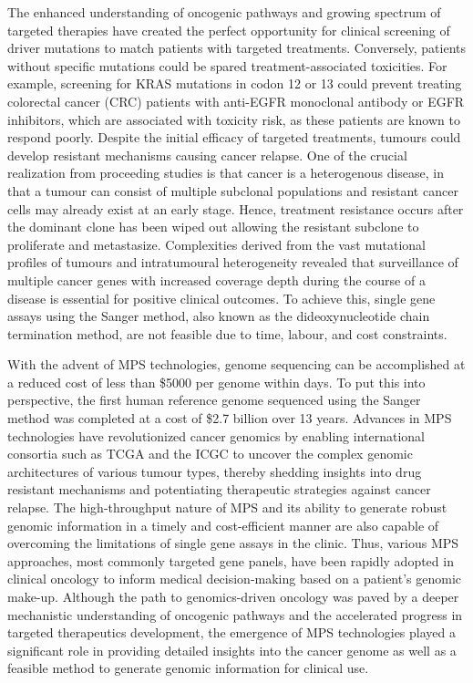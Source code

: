 The enhanced understanding of oncogenic pathways and growing spectrum of targeted therapies have created the perfect opportunity for clinical screening of driver mutations to match patients with targeted treatments. Conversely, patients without specific mutations could be spared treatment-associated toxicities. For example, screening for KRAS mutations in codon 12 or 13 could prevent treating colorectal cancer (CRC) patients with anti-EGFR monoclonal antibody or EGFR inhibitors, which are associated with toxicity risk, as these patients are known to respond poorly. Despite the initial efficacy of targeted treatments, tumours could develop resistant mechanisms causing cancer relapse. One of the crucial realization from proceeding studies is that cancer is a heterogenous disease, in that a tumour can consist of multiple subclonal populations and resistant cancer cells may already exist at an early stage. Hence, treatment resistance occurs after the dominant clone has been wiped out allowing the resistant subclone to proliferate and metastasize. Complexities derived from the vast mutational profiles of tumours and intratumoural heterogeneity revealed that surveillance of multiple cancer genes with increased coverage depth during the course of a disease is essential for positive clinical outcomes. To achieve this, single gene assays using the Sanger method, also known as the dideoxynucleotide chain termination method, are not feasible due to time, labour, and cost constraints.

With the advent of MPS technologies, genome sequencing can be accomplished at a reduced cost of less than \$5000 per genome within days. To put this into perspective, the first human reference genome sequenced using the Sanger method was completed at a cost of \$2.7 billion over 13 years. Advances in MPS technologies have revolutionized cancer genomics by enabling international consortia such as TCGA and the ICGC to uncover the complex genomic architectures of various tumour types, thereby shedding insights into drug resistant mechanisms and potentiating therapeutic strategies against cancer relapse. The high-throughput nature of MPS and its ability to generate robust genomic information in a timely and cost-efficient manner are also capable of overcoming the limitations of single gene assays in the clinic. Thus, various MPS approaches, most commonly targeted gene panels, have been rapidly adopted in clinical oncology to inform medical decision-making based on a patient's genomic make-up. Although the path to genomics-driven oncology was paved by a deeper mechanistic understanding of oncogenic pathways and the accelerated progress in targeted therapeutics development, the emergence of MPS technologies played a significant role in providing detailed insights into the cancer genome as well as a feasible method to generate genomic information for clinical use.

